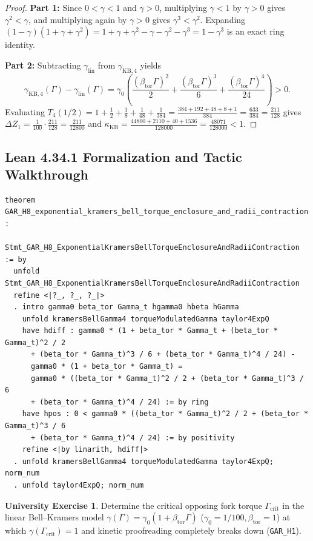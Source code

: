 \documentclass[11pt,a4paper]{article}
\theoremstyle{definition}
\newtheorem{exercise}[theorem]{University Exercise}
\theoremstyle{remark}
\begin{document}
\begin{proof}
\textbf{Part 1:} Since $0 < \gamma < 1$ and $\gamma > 0$, multiplying $\gamma < 1$ by $\gamma > 0$ gives $\gamma^2 < \gamma$, and multiplying again by $\gamma > 0$ gives $\gamma^3 < \gamma^2$. Expanding $(1-\gamma)(1+\gamma+\gamma^2) = 1 + \gamma + \gamma^2 - \gamma - \gamma^2 - \gamma^3 = 1 - \gamma^3$ is an exact ring identity.

\textbf{Part 2:} Subtracting $\gamma_{\mathrm{lin}}$ from $\gamma_{\mathrm{KB},4}$ yields
\[
  \gamma_{\mathrm{KB},4}(\Gamma) - \gamma_{\mathrm{lin}}(\Gamma) = \gamma_0\left(\frac{(\beta_{\mathrm{tor}}\Gamma)^2}{2} + \frac{(\beta_{\mathrm{tor}}\Gamma)^3}{6} + \frac{(\beta_{\mathrm{tor}}\Gamma)^4}{24}\right) > 0.
\]
Evaluating $T_4(1/2) = 1 + \frac{1}{2} + \frac{1}{8} + \frac{1}{48} + \frac{1}{384} = \frac{384 + 192 + 48 + 8 + 1}{384} = \frac{633}{384} = \frac{211}{128}$ gives $\Delta Z_1 = \frac{1}{100}\cdot\frac{211}{128} = \frac{211}{12800}$ and $\kappa_{\mathrm{KB}} = \frac{44800 + 2110 + 40 + 1536}{128000} = \frac{48071}{128000} < 1$.
\end{proof}

\subsection{Lean 4.34.1 Formalization and Tactic Walkthrough}
\begin{lstlisting}
theorem GAR_H8_exponential_kramers_bell_torque_enclosure_and_radii_contraction :
    Stmt_GAR_H8_ExponentialKramersBellTorqueEnclosureAndRadiiContraction := by
  unfold Stmt_GAR_H8_ExponentialKramersBellTorqueEnclosureAndRadiiContraction
  refine <|?_, ?_, ?_|>
  . intro gamma0 beta_tor Gamma_t hgamma0 hbeta hGamma
    unfold kramersBellGamma4 torqueModulatedGamma taylor4ExpQ
    have hdiff : gamma0 * (1 + beta_tor * Gamma_t + (beta_tor * Gamma_t)^2 / 2
      + (beta_tor * Gamma_t)^3 / 6 + (beta_tor * Gamma_t)^4 / 24) -
      gamma0 * (1 + beta_tor * Gamma_t) =
      gamma0 * ((beta_tor * Gamma_t)^2 / 2 + (beta_tor * Gamma_t)^3 / 6
      + (beta_tor * Gamma_t)^4 / 24) := by ring
    have hpos : 0 < gamma0 * ((beta_tor * Gamma_t)^2 / 2 + (beta_tor * Gamma_t)^3 / 6
      + (beta_tor * Gamma_t)^4 / 24) := by positivity
    refine <|by linarith, hdiff|>
  . unfold kramersBellGamma4 torqueModulatedGamma taylor4ExpQ; norm_num
  . unfold taylor4ExpQ; norm_num
\end{lstlisting}

\begin{exercise}
Determine the critical opposing fork torque $\Gamma_{\mathrm{crit}}$ in the linear Bell--Kramers model $\gamma(\Gamma) = \gamma_0(1 + \beta_{\mathrm{tor}}\Gamma)$ ($\gamma_0 = 1/100, \beta_{\mathrm{tor}} = 1$) at which $\gamma(\Gamma_{\mathrm{crit}}) = 1$ and kinetic proofreading completely breaks down (\texttt{GAR\_H1}).
\end{exercise}
\end{document}
